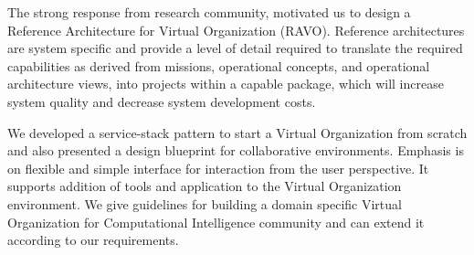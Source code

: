 \documentclass[]{article}
\begin{document}
The strong response from research community, motivated us to design a Reference Architecture for Virtual Organization (RAVO). Reference architectures are system specific and provide a level of detail required to translate the required capabilities as derived from missions, operational concepts, and operational architecture views, into projects within a capable package, which will increase system quality and decrease system development costs.

We developed a service-stack pattern to start a Virtual Organization from scratch and also presented a design blueprint for collaborative environments. Emphasis is on flexible and simple interface for interaction from the user perspective. It supports addition of tools and application to the Virtual Organization environment. We give guidelines for building a domain specific Virtual Organization for Computational Intelligence community and can extend it according to our requirements.
\end{document}
